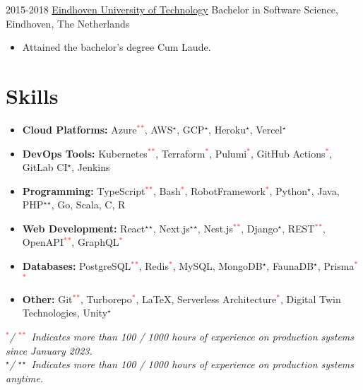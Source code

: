 {     \customcventry
     {2015-2018}
     {\color{blue}\href{https://tue.nl/}{Eindhoven University of Technology}}
     {Bachelor in Software Science,}
     {Eindhoven, The Netherlands}{}{}
     {
     	\begin{itemize}[leftmargin=0.6cm, label={\textbullet}]
     		\item Attained the bachelor's degree Cum Laude. 
     	\end{itemize}
     }
}

\section{Skills}
{
	\newcommand{\skilled}{\textcolor{black}{$^\star$}}
	\newcommand{\sskilled}{\skilled\skilled}
	\newcommand{\skilledRecent}{\textcolor{red}{$^*$}}
	\newcommand{\sskilledRecent}{\skilledRecent\skilledRecent}
			
	\begin{itemize}[label=\textbullet]
		\item {\textbf{Cloud Platforms:} Azure\sskilledRecent, AWS\skilled, GCP\skilled, Heroku\skilled, Vercel\skilled}
		\item {\textbf{DevOps Tools:} Kubernetes\sskilledRecent, Terraform\skilledRecent, Pulumi\skilledRecent, GitHub Actions\skilledRecent, GitLab CI\skilled, Jenkins}
		\item {\textbf{Programming:} TypeScript\sskilledRecent, Bash\skilledRecent, RobotFramework\skilledRecent, Python\skilled, Java, PHP\sskilled, Go, Scala, C, R}
		\item {\textbf{Web Development:} React\sskilled, Next.js\sskilled, Nest.js\sskilledRecent, Django\skilled, REST\sskilledRecent, OpenAPI\sskilledRecent, GraphQL\skilledRecent}
		\item {\textbf{Databases:} PostgreSQL\sskilledRecent, Redis\skilledRecent, MySQL, MongoDB\skilled, FaunaDB\skilled, Prisma\sskilledRecent}
		\item {\textbf{Other:} Git\sskilledRecent, Turborepo\skilledRecent, LaTeX, Serverless Architecture\skilledRecent, Digital Twin Technologies, Unity\skilled}
	\end{itemize}
	{\footnotesize%
		\vspace{-2mm}%
		\emph{%
			\hspace*{4mm}\skilledRecent / \sskilledRecent~Indicates more than 100 / 1000 hours of experience on production systems since January 2023.
			} \\
		\emph{%
			\hspace*{4mm}\skilled / \sskilled~Indicates more than 100 / 1000 hours of experience on production systems anytime.}
	}
			        
}
    


